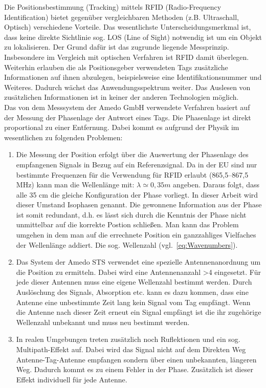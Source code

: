 Die Positionsbestimmung (Tracking) mittels RFID (Radio-Frequency Identification) bietet gegenüber vergleichbaren Methoden (z.B. Ultraschall, Optisch) verschiedene Vorteile. Das wesentlichste Unterscheidungsmerkmal ist, dass keine direkte Sichtlinie sog. LOS (Line of Sight) notwendig ist um ein Objekt zu lokalisieren. Der Grund dafür ist das zugrunde liegende Messprinzip. Insbesondere im Vergleich mit optischen Verfahren ist RFID damit überlegen. Weiterhin erlauben die als Positionsgeber verwendeten Tags zusätzliche Informationen auf ihnen abzulegen, beispielsweise eine Identifikationsnummer und Weiteres. Dadurch wächst das Anwendungsspektrum weiter. Das Auslesen von zusätzlichen Informationen ist in keiner der anderen Technologien möglich.\\

Das von dem Messsystem der {Amedo GmbH} verwendete Verfahren basiert auf der Messung der Phasenlage der Antwort eines Tags. Die Phasenlage ist direkt proportional zu einer Entfernung. Dabei kommt es aufgrund der Physik im wesentlichen zu folgenden Problemen:
\begin{enumerate}
	\item Die Messung der Position erfolgt über die Auswertung der Phasenlage des empfangenen Signals in Bezug auf ein Referenzsignal. Da in der EU sind nur bestimmte Frequenzen für die Verwendung für RFID erlaubt (865,5–867,5 MHz) kann man die Wellenlänge mit: $ \lambda\simeq0,35 m $ angeben. Daraus folgt, dass alle 35 cm die gleiche Konfiguration der Phase vorliegt. In dieser Arbeit wird dieser Umstand Isophasen genannt. Die gewonnene Information aus der Phase ist somit redundant, d.h. es lässt sich durch die Kenntnis der Phase nicht unmittelbar auf die korrekte Postion schließen. Man kann das Problem umgehen in dem man auf die errechnete Position ein ganzzahliges Vielfaches der Wellenlänge addiert. Die sog. Wellenzahl (vgl.~\eqref{eq:Wavenumbers}).
	\item Das System der Amedo STS verwendet eine spezielle Antennenanordnung um die Position zu ermitteln. Dabei wird eine Antennenanzahl >4 eingesetzt. Für jede dieser Antennen muss eine eigene Wellenzahl bestimmt werden. Durch Auslöschung des Signals, Absorption etc. kann es dazu kommen, dass eine Antenne eine unbestimmte Zeit lang kein Signal vom Tag empfängt. Wenn die Antenne nach dieser Zeit erneut ein Signal empfängt ist die ihr zugehörige Wellenzahl unbekannt und muss neu bestimmt werden. 
	\item In realen Umgebungen treten zusätzlich noch Ruflektionen und ein sog. Multipath-Effekt auf. Dabei wird das Signal nicht auf dem Direkten Weg Antenne-Tag-Antenne empfangen sondern über einen unbekannten, längeren Weg. Dadurch kommt es zu einem Fehler in der Phase. Zusätzlich ist dieser Effekt individuell für jede Antenne.
\end{enumerate}

